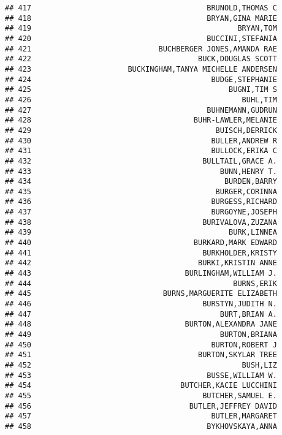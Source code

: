 \documentclass[
]{article}
\begin{document}
\begin{verbatim}
## 417                                        BRUNOLD,THOMAS C
## 418                                        BRYAN,GINA MARIE
## 419                                               BRYAN,TOM
## 420                                        BUCCINI,STEFANIA
## 421                             BUCHBERGER JONES,AMANDA RAE
## 422                                      BUCK,DOUGLAS SCOTT
## 423                      BUCKINGHAM,TANYA MICHELLE ANDERSEN
## 424                                         BUDGE,STEPHANIE
## 425                                             BUGNI,TIM S
## 426                                                BUHL,TIM
## 427                                        BUHNEMANN,GUDRUN
## 428                                     BUHR-LAWLER,MELANIE
## 429                                          BUISCH,DERRICK
## 430                                         BULLER,ANDREW R
## 431                                         BULLOCK,ERIKA C
## 432                                       BULLTAIL,GRACE A.
## 433                                           BUNN,HENRY T.
## 434                                            BURDEN,BARRY
## 435                                          BURGER,CORINNA
## 436                                         BURGESS,RICHARD
## 437                                         BURGOYNE,JOSEPH
## 438                                       BURIVALOVA,ZUZANA
## 439                                             BURK,LINNEA
## 440                                     BURKARD,MARK EDWARD
## 441                                       BURKHOLDER,KRISTY
## 442                                      BURKI,KRISTIN ANNE
## 443                                   BURLINGHAM,WILLIAM J.
## 444                                              BURNS,ERIK
## 445                              BURNS,MARGUERITE ELIZABETH
## 446                                       BURSTYN,JUDITH N.
## 447                                           BURT,BRIAN A.
## 448                                   BURTON,ALEXANDRA JANE
## 449                                           BURTON,BRIANA
## 450                                         BURTON,ROBERT J
## 451                                      BURTON,SKYLAR TREE
## 452                                                BUSH,LIZ
## 453                                        BUSSE,WILLIAM W.
## 454                                  BUTCHER,KACIE LUCCHINI
## 455                                       BUTCHER,SAMUEL E.
## 456                                    BUTLER,JEFFREY DAVID
## 457                                         BUTLER,MARGARET
## 458                                        BYKHOVSKAYA,ANNA

\end{verbatim}
\end{document}
